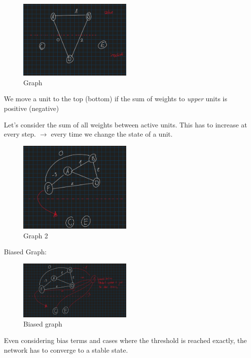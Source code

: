 \documentclass{article}
\begin{document}
\begin{figure}[H]
\centering
\includegraphics[width=0.5\textwidth]{assets/graph.png}
\caption{Graph}
\end{figure}

\noindent We move a unit to the top (bottom) if the sum of weights to \textit{upper} units is positive (negative)

\noindent Let's consider the sum of all weights between active units. This has to increase at every step. $\rightarrow$ every time we change the state of a unit.

\begin{figure}[H]
\centering
\includegraphics[width=0.5\textwidth]{assets/graph2.png}
\caption{Graph 2}
\end{figure}

\noindent Biased Graph:

\begin{figure}[H]
\centering
\includegraphics[width=0.5\textwidth]{assets/biasedGraph.png}
\caption{Biased graph}
\end{figure}

\noindent Even considering bias terms and cases where the threshold is reached exactly, the network has to converge to a stable state.
\end{document}
